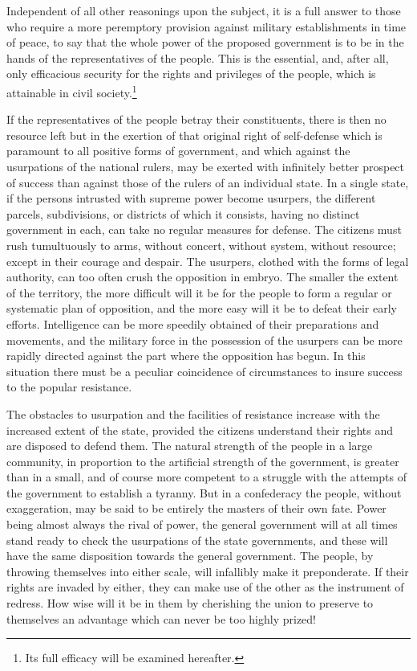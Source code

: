 Independent of all other reasonings upon the subject, it is a full answer to those who require a more peremptory provision against military establishments in time of peace, to say that the whole power of the proposed government is to be in the hands of the representatives of the people. This is the essential, and, after all, only efficacious security for the rights and privileges of the people, which is attainable in civil society.\footnote{Its full efficacy will be examined hereafter.}

If the representatives of the people betray their constituents, there is then no resource left but in the exertion of that original right of self-defense which is paramount to all positive forms of government, and which against the usurpations of the national rulers, may be exerted with infinitely better prospect of success than against those of the rulers of an individual state. In a single state, if the persons intrusted with supreme power become usurpers, the different parcels, subdivisions, or districts of which it consists, having no distinct government in each, can take no regular measures for defense. The citizens must rush tumultuously to arms, without concert, without system, without resource; except in their courage and despair. The usurpers, clothed with the forms of legal authority, can too often crush the opposition in embryo. The smaller the extent of the territory, the more difficult will it be for the people to form a regular or systematic plan of opposition, and the more easy will it be to defeat their early efforts. Intelligence can be more speedily obtained of their preparations and movements, and the military force in the possession of the usurpers can be more rapidly directed against the part where the opposition has begun. In this situation there must be a peculiar coincidence of circumstances to insure success to the popular resistance.

The obstacles to usurpation and the facilities of resistance increase with the increased extent of the state, provided the citizens understand their rights and are disposed to defend them. The natural strength of the people in a large community, in proportion to the artificial strength of the government, is greater than in a small, and of course more competent to a struggle with the attempts of the government to establish a tyranny. But in a confederacy the people, without exaggeration, may be said to be entirely the masters of their own fate. Power being almost always the rival of power, the general government will at all times stand ready to check the usurpations of the state governments, and these will have the same disposition towards the general government. The people, by throwing themselves into either scale, will infallibly make it preponderate. If their rights are invaded by either, they can make use of the other as the instrument of redress. How wise will it be in them by cherishing the union to preserve to themselves an advantage which can never be too highly prized!


